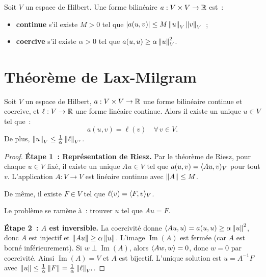 \begin{definition}
Soit $V$ un espace de Hilbert. Une forme bilin\'eaire $a : V \times V \to \mathbb{R}$ est~:
\begin{itemize}
    \item \textbf{continue} s'il existe $M > 0$ tel que $\left| a(u,v) \right| \leq M\left\| u \right\|_V \left\| v \right\|_V$~;
    \item \textbf{coercive} s'il existe $\alpha > 0$ tel que $a(u,u) \geq \alpha \left\| u \right\|_V^2$.
\end{itemize}
\end{definition}

\section{Th\'eor\`eme de Lax-Milgram}

\begin{theoreme}
\label{thm:lax_milgram}
Soit $V$ un espace de Hilbert, $a : V \times V \to \mathbb{R}$ une forme bilin\'eaire
continue et coercive, et $\ell : V \to \mathbb{R}$ une forme lin\'eaire continue.
Alors il existe un unique $u \in V$ tel que~:
\[
    a(u, v) = \ell(v) \quad \forall\, v \in V.
\]
De plus, $\left\| u \right\|_V \leq \frac{1}{\alpha}\left\| \ell \right\|_{V'}$.
\end{theoreme}

\begin{proof}
\textbf{\'Etape 1~: Repr\'esentation de Riesz.}
Par le th\'eor\`eme de Riesz, pour chaque $u \in V$ fix\'e, il existe un unique
$Au \in V$ tel que $a(u, v) = \langle Au, v \rangle_V$ pour tout $v$. L'application
$A : V \to V$ est lin\'eaire continue avec $\left\| A \right\| \leq M$.

De m\^eme, il existe $F \in V$ tel que $\ell(v) = \langle F, v \rangle_V$.

Le probl\`eme se ram\`ene \`a~: trouver $u$ tel que $Au = F$.

\textbf{\'Etape 2~: $A$ est inversible.}
La coercivit\'e donne $\langle Au, u \rangle = a(u,u) \geq \alpha\left\| u \right\|^2$, donc $A$
est injectif et $\left\| Au \right\| \geq \alpha\left\| u \right\|$. L'image $\operatorname{Im}(A)$
est ferm\'ee (car $A$ est born\'e inf\'erieurement). Si $w \perp \operatorname{Im}(A)$,
alors $\langle Aw, w \rangle = 0$, donc $w = 0$ par coercivit\'e. Ainsi
$\operatorname{Im}(A) = V$ et $A$ est bijectif. L'unique solution est
$u = A^{-1}F$ avec $\left\| u \right\| \leq \frac{1}{\alpha}\left\| F \right\| = \frac{1}{\alpha}\left\| \ell \right\|_{V'}$.
\end{proof}


